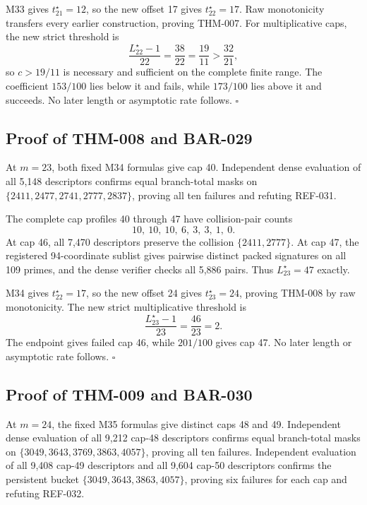 \documentclass[11pt]{article}
\begin{document}
M33 gives \(t_{21}^\star=12\), so the new offset 17 gives
\(t_{22}^\star=17\). Raw monotonicity transfers every earlier construction,
proving THM-007. For multiplicative caps, the new strict threshold is
\[
\frac{L_{22}^\star-1}{22}=\frac{38}{22}=\frac{19}{11}>
\frac{32}{21},
\]
so \(c>19/11\) is necessary and sufficient on the complete finite range.
The coefficient \(153/100\) lies below it and fails, while \(173/100\) lies
above it and succeeds. No later length or asymptotic rate follows.
\(\square\)

\subsection{Proof of THM-008 and BAR-029}
\label{proof:THM-008-BAR-029}

At \(m=23\), both fixed M34 formulas give cap 40. Independent dense
evaluation of all 5,148 descriptors confirms equal branch-total masks on
\(\{2411,2477,2741,2777,2837\}\), proving all ten failures and refuting
REF-031.

The complete cap profiles 40 through 47 have collision-pair counts
\[
10,\ 10,\ 10,\ 6,\ 3,\ 3,\ 1,\ 0.
\]
At cap 46, all 7,470 descriptors preserve the collision
\(\{2411,2777\}\). At cap 47, the registered 94-coordinate sublist gives
pairwise distinct packed signatures on all 109 primes, and the dense verifier
checks all 5,886 pairs. Thus \(L_{23}^\star=47\) exactly.

M34 gives \(t_{22}^\star=17\), so the new offset 24 gives
\(t_{23}^\star=24\), proving THM-008 by raw monotonicity. The new strict
multiplicative threshold is
\[
\frac{L_{23}^\star-1}{23}=\frac{46}{23}=2.
\]
The endpoint gives failed cap 46, while \(201/100\) gives cap 47. No later
length or asymptotic rate follows. \(\square\)

\subsection{Proof of THM-009 and BAR-030}
\label{proof:THM-009-BAR-030}

At \(m=24\), the fixed M35 formulas give distinct caps 48 and 49.
Independent dense evaluation of all 9,212 cap-48 descriptors confirms equal
branch-total masks on \(\{3049,3643,3769,3863,4057\}\), proving all ten
failures. Independent evaluation of all 9,408 cap-49 descriptors and all
9,604 cap-50 descriptors confirms the persistent bucket
\(\{3049,3643,3863,4057\}\), proving six failures for each cap and refuting
REF-032.
\end{document}
